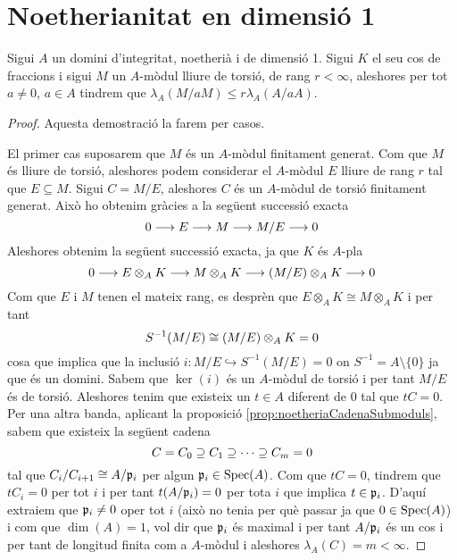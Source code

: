 \documentclass[../../../main.tex]{subfiles}
\begin{document}
\section{Noetherianitat en dimensió 1}


\begin{lema}
\label{lema:noetheriaDimensio1} Sigui $A$ un domini d'integritat, noetherià i de dimensió 1. Sigui $K$ el seu cos de fraccions i sigui $M$ un $A$-mòdul lliure de torsió, de rang $r<\infty$, aleshores per tot $a\neq 0$, $a\in A$ tindrem que $\lambda_A(M/aM)\leq r\lambda_A(A/aA)$.
\end{lema}
\begin{proof}
Aquesta demostració la farem per casos. 

El primer cas suposarem que $M$ és un $A$-mòdul finitament generat. Com que $M$ és lliure de torsió, aleshores podem considerar el $A$-mòdul $E$ lliure de rang $r$ tal que $E\subseteq M$. Sigui $C = M/E$, aleshores $C$ és un $A$-mòdul de torsió finitament generat. Això ho obtenim gràcies a la següent successió exacta
\begin{equation}
    \notag
    0\longrightarrow E\longrightarrow M\longrightarrow M/E\longrightarrow 0
\end{equation}
Aleshores obtenim la següent successió exacta, ja que $K$ és $A$-pla
\begin{equation}
    \notag
    0\longrightarrow E\otimes_AK\longrightarrow M\otimes_AK\longrightarrow (M/E)\otimes_AK\longrightarrow 0
\end{equation}
Com que $E$ i $M$ tenen el mateix rang, es desprèn que $E\otimes_AK\cong M\otimes_AK$ i per tant 
\begin{equation}
    \notag
    S^{-1}(M/E)\cong (M/E)\otimes_AK = 0
\end{equation}
cosa que implica que la inclusió $i:M/E\hookrightarrow S^{-1}(M/E) = 0$ on $S^{-1} = A\setminus\{0\}$ ja que és un domini. Sabem que $\ker(i)$ és un $A$-mòdul de torsió i per tant $M/E$ és de torsió. Aleshores tenim que existeix un $t\in A$ diferent de $0$ tal que $tC = 0$. Per una altra banda, aplicant la proposició \ref{prop:noetheriaCadenaSubmoduls}, sabem que existeix la següent cadena
\begin{equation}
    \notag
    C = C_0\supseteq C_1\supseteq \cdots\supseteq C_m=0
\end{equation}
tal que $C_i/C_{i+1}\cong A/\mathfrak{p}_i$ per algun $\mathfrak{p}_i\in\mathrm{Spec}(A)$. Com que $tC = 0$, tindrem que $tC_i = 0$ per tot $i$ i per tant $t(A/\mathfrak{p}_i)=0$ per tota $i$ que implica $t\in \mathfrak{p}_i$. D'aquí extraiem que $\mathfrak{p}_i\neq 0$ oper tot $i$ (això no tenia per què passar ja que $0\in\mathrm{Spec}(A)$) i com que $\dim(A) = 1$, vol dir que $\mathfrak{p}_i$ és maximal i per tant $A/\mathfrak{p}_i$ és un cos i per tant de longitud finita com a $A$-mòdul i aleshores $\lambda_A(C) = m<\infty$.


\end{proof}
\end{document}

